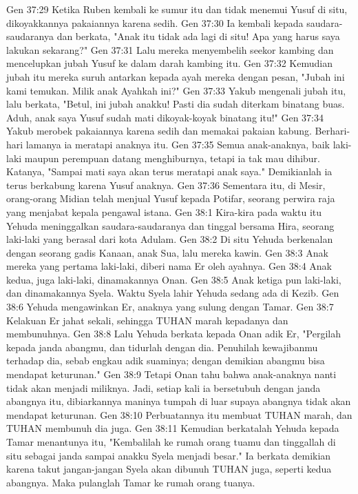 Gen 37:29  Ketika Ruben kembali ke sumur itu dan tidak menemui Yusuf di situ, dikoyakkannya pakaiannya karena sedih.
Gen 37:30  Ia kembali kepada saudara-saudaranya dan berkata, "Anak itu tidak ada lagi di situ! Apa yang harus saya lakukan sekarang?"
Gen 37:31  Lalu mereka menyembelih seekor kambing dan mencelupkan jubah Yusuf ke dalam darah kambing itu.
Gen 37:32  Kemudian jubah itu mereka suruh antarkan kepada ayah mereka dengan pesan, "Jubah ini kami temukan. Milik anak Ayahkah ini?"
Gen 37:33  Yakub mengenali jubah itu, lalu berkata, "Betul, ini jubah anakku! Pasti dia sudah diterkam binatang buas. Aduh, anak saya Yusuf sudah mati dikoyak-koyak binatang itu!"
Gen 37:34  Yakub merobek pakaiannya karena sedih dan memakai pakaian kabung. Berhari-hari lamanya ia meratapi anaknya itu.
Gen 37:35  Semua anak-anaknya, baik laki-laki maupun perempuan datang menghiburnya, tetapi ia tak mau dihibur. Katanya, "Sampai mati saya akan terus meratapi anak saya." Demikianlah ia terus berkabung karena Yusuf anaknya.
Gen 37:36  Sementara itu, di Mesir, orang-orang Midian telah menjual Yusuf kepada Potifar, seorang perwira raja yang menjabat kepala pengawal istana.
Gen 38:1  Kira-kira pada waktu itu Yehuda meninggalkan saudara-saudaranya dan tinggal bersama Hira, seorang laki-laki yang berasal dari kota Adulam.
Gen 38:2  Di situ Yehuda berkenalan dengan seorang gadis Kanaan, anak Sua, lalu mereka kawin.
Gen 38:3  Anak mereka yang pertama laki-laki, diberi nama Er oleh ayahnya.
Gen 38:4  Anak kedua, juga laki-laki, dinamakannya Onan.
Gen 38:5  Anak ketiga pun laki-laki, dan dinamakannya Syela. Waktu Syela lahir Yehuda sedang ada di Kezib.
Gen 38:6  Yehuda mengawinkan Er, anaknya yang sulung dengan Tamar.
Gen 38:7  Kelakuan Er jahat sekali, sehingga TUHAN marah kepadanya dan membunuhnya.
Gen 38:8  Lalu Yehuda berkata kepada Onan adik Er, "Pergilah kepada janda abangmu, dan tidurlah dengan dia. Penuhilah kewajibanmu terhadap dia, sebab engkau adik suaminya; dengan demikian abangmu bisa mendapat keturunan."
Gen 38:9  Tetapi Onan tahu bahwa anak-anaknya nanti tidak akan menjadi miliknya. Jadi, setiap kali ia bersetubuh dengan janda abangnya itu, dibiarkannya maninya tumpah di luar supaya abangnya tidak akan mendapat keturunan.
Gen 38:10  Perbuatannya itu membuat TUHAN marah, dan TUHAN membunuh dia juga.
Gen 38:11  Kemudian berkatalah Yehuda kepada Tamar menantunya itu, "Kembalilah ke rumah orang tuamu dan tinggallah di situ sebagai janda sampai anakku Syela menjadi besar." Ia berkata demikian karena takut jangan-jangan Syela akan dibunuh TUHAN juga, seperti kedua abangnya. Maka pulanglah Tamar ke rumah orang tuanya.

